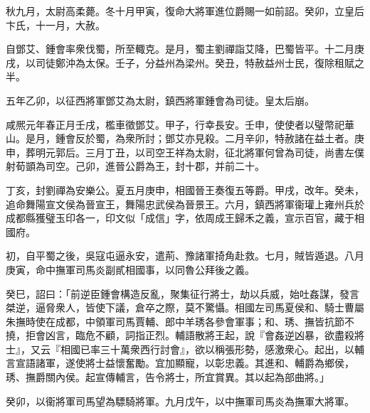 \begin{pinyinscope}
 
 
 
 秋九月，太尉高柔薨。冬十月甲寅，復命大將軍進位爵賜一如前詔。癸卯，立皇后卞氏，十一月，大赦。
 
 
 
 
 自鄧艾、鍾會率衆伐蜀，所至輙克。是月，蜀主劉禪詣艾降，巴蜀皆平。十二月庚戌，以司徒鄭沖為太保。壬子，分益州為梁州。癸丑，特赦益州士民，復除租賦之半。
 
 
 
 
 五年乙卯，以征西將軍鄧艾為太尉，鎮西將軍鍾會為司徒。皇太后崩。
 
 
 
 
 咸熈元年春正月壬戌，檻車徵鄧艾。甲子，行幸長安。壬申，使使者以璧幣祀華山。是月，鍾會反於蜀，為衆所討；鄧艾亦見殺。二月辛卯，特赦諸在益土者。庚申，葬明元郭后。三月丁丑，以司空王祥為太尉，征北將軍何曾為司徒，尚書左僕射荀顗為司空。己卯，進晉公爵為王，封十郡，并前二十。
 
 
 丁亥，封劉禪為安樂公。夏五月庚申，相國晉王奏復五等爵。甲戌，改年。癸未，追命舞陽宣文侯為晉宣王，舞陽忠武侯為晉景王。六月，鎮西將軍衞瓘上雍州兵於成都縣獲璧玉印各一，印文似「成信」字，依周成王歸禾之義，宣示百官，藏于相國府。
 
 
 
 
 初，自平蜀之後，吳寇屯逼永安，遣荊、豫諸軍掎角赴救。七月，賊皆遁退。八月庚寅，命中撫軍司馬炎副貳相國事，以同魯公拜後之義。
 
 
 
 
 癸巳，詔曰：「前逆臣鍾會構造反亂，聚集征行將士，劫以兵威，始吐姦謀，發言桀逆，逼脅衆人，皆使下議，倉卒之際，莫不驚懾。相國左司馬夏侯和、騎士曹屬朱撫時使在成都，中領軍司馬賈輔、郎中羊琇各參會軍事；和、琇、撫皆抗節不撓，拒會凶言，臨危不顧，詞指正烈。輔語散將王起，說『會姦逆凶暴，欲盡殺將士』，又云『相國已率三十萬衆西行討會』，欲以稱張形勢，感激衆心。起出，以輔言宣語諸軍，遂使將士益懷奮勵。宜加顯寵，以彰忠義。其進和、輔爵為鄉侯，琇、撫爵關內侯。起宣傳輔言，告令將士，所宜賞異。其以起為部曲將。」
 
 
 
 
 癸卯，以衞將軍司馬望為驃騎將軍。九月戊午，以中撫軍司馬炎為撫軍大將軍。
 
 
 

\end{pinyinscope}
